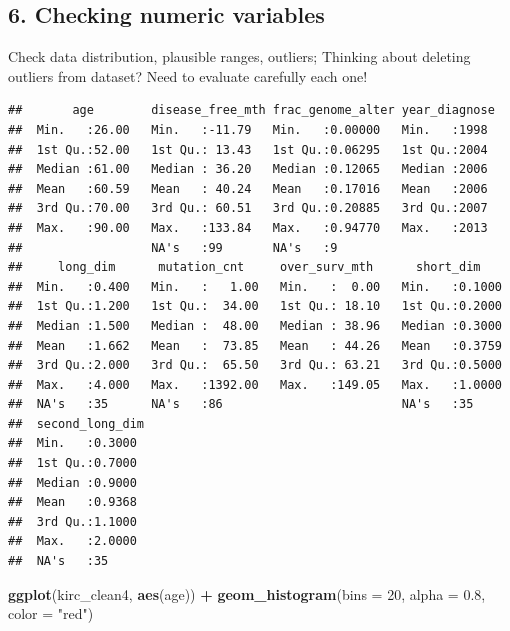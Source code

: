 \documentclass[]{article}
\newenvironment{Shaded}{\begin{snugshade}}{\end{snugshade}}
\newcommand{\KeywordTok}[1]{\textcolor[rgb]{0.13,0.29,0.53}{\textbf{#1}}}
\newcommand{\DataTypeTok}[1]{\textcolor[rgb]{0.13,0.29,0.53}{#1}}
\newcommand{\DecValTok}[1]{\textcolor[rgb]{0.00,0.00,0.81}{#1}}
\newcommand{\FloatTok}[1]{\textcolor[rgb]{0.00,0.00,0.81}{#1}}
\newcommand{\StringTok}[1]{\textcolor[rgb]{0.31,0.60,0.02}{#1}}
\newcommand{\OperatorTok}[1]{\textcolor[rgb]{0.81,0.36,0.00}{\textbf{#1}}}
\newcommand{\NormalTok}[1]{#1}
\begin{document}
\subsection{6. Checking numeric
variables}\label{checking-numeric-variables}

Check data distribution, plausible ranges, outliers; Thinking about
deleting outliers from dataset? Need to evaluate carefully each one!

\begin{Shaded}
\end{Shaded}

\begin{verbatim}
##       age        disease_free_mth frac_genome_alter year_diagnose 
##  Min.   :26.00   Min.   :-11.79   Min.   :0.00000   Min.   :1998  
##  1st Qu.:52.00   1st Qu.: 13.43   1st Qu.:0.06295   1st Qu.:2004  
##  Median :61.00   Median : 36.20   Median :0.12065   Median :2006  
##  Mean   :60.59   Mean   : 40.24   Mean   :0.17016   Mean   :2006  
##  3rd Qu.:70.00   3rd Qu.: 60.51   3rd Qu.:0.20885   3rd Qu.:2007  
##  Max.   :90.00   Max.   :133.84   Max.   :0.94770   Max.   :2013  
##                  NA's   :99       NA's   :9                       
##     long_dim      mutation_cnt     over_surv_mth      short_dim     
##  Min.   :0.400   Min.   :   1.00   Min.   :  0.00   Min.   :0.1000  
##  1st Qu.:1.200   1st Qu.:  34.00   1st Qu.: 18.10   1st Qu.:0.2000  
##  Median :1.500   Median :  48.00   Median : 38.96   Median :0.3000  
##  Mean   :1.662   Mean   :  73.85   Mean   : 44.26   Mean   :0.3759  
##  3rd Qu.:2.000   3rd Qu.:  65.50   3rd Qu.: 63.21   3rd Qu.:0.5000  
##  Max.   :4.000   Max.   :1392.00   Max.   :149.05   Max.   :1.0000  
##  NA's   :35      NA's   :86                         NA's   :35      
##  second_long_dim 
##  Min.   :0.3000  
##  1st Qu.:0.7000  
##  Median :0.9000  
##  Mean   :0.9368  
##  3rd Qu.:1.1000  
##  Max.   :2.0000  
##  NA's   :35
\end{verbatim}

\begin{Shaded}
\begin{Highlighting}[]
\KeywordTok{ggplot}\NormalTok{(kirc_clean4, }\KeywordTok{aes}\NormalTok{(age)) }\OperatorTok{+}
\StringTok{     }\KeywordTok{geom_histogram}\NormalTok{(}\DataTypeTok{bins =} \DecValTok{20}\NormalTok{, }\DataTypeTok{alpha =} \FloatTok{0.8}\NormalTok{, }\DataTypeTok{color =} \StringTok{"red"}\NormalTok{)}
\end{Highlighting}
\end{Shaded}
\end{document}
